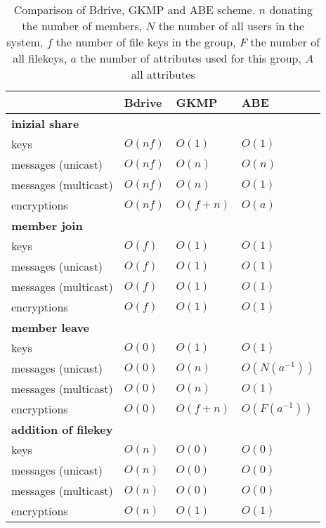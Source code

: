 \begin{table*}[!ht]
\centering
\begin{tabular}{l 		| l 						| l 						| l }
 						& \textbf{Bdrive}			& \textbf{\ac{GKMP}} 			& \textbf{\ac{ABE}} 		\\
\hline
\textbf{inizial share} 																				\\
keys 					& $O(nf)$ 					& $O(1)$	 				& $O(1)$			\\
messages (unicast)		& $O(nf)$  					& $O(n)$					& $O(n)$			\\
messages (multicast) 	& $O(nf)$ 					& $O(n)$ 					& $O(1)$			\\
encryptions				& $O(nf)$ 					& $O(f + n)$				& $O(a)$ 			\\
\hline
\textbf{member join} 																				\\
keys 					& $O(f)$   					& $O(1)$					& $O(1)$			\\
messages (unicast)		& $O(f)$  					& $O(1)$  					& $O(1)$ 			\\
messages (multicast) 	& $O(f)$ 	 				& $O(1)$					& $O(1)$ 			\\
encryptions				& $O(f)$  					& $O(1)$					& $O(1)$ 			\\
\hline
\textbf{member leave}																				\\
keys 					& $O(0)$					& $O(1)$					& $O(1)$			\\
messages (unicast)		& $O(0)$					& $O(n)$  					& $O(N(a^{-1}))$	\\
messages (multicast)	& $O(0)$					& $O(n)$					& $O(1)$ 			\\ 
encryptions 			& $O(0)$					& $O(f + n)$ 				& $O(F(a^{-1}))$	\\
\hline	
\textbf{addition of filekey}																		\\
keys 					& $O(n)$	 				& $O(0)$					& $O(0)$			\\
messages (unicast)		& $O(n)$	 				& $O(0)$					& $O(0)$			\\
messages (multicast)	& $O(n)$ 					& $O(0)$ 					& $O(0)$			\\
encryptions				& $O(n)$ 					& $O(1)$					& $O(1)$			\\
\hline
\end{tabular}
\caption{Comparison of Bdrive, \ac{GKMP} and \ac{ABE} scheme. $n$ donating the number of members, $N$ the number of all users in the system, $f$ the number of file keys in the group, $F$ the number of all filekeys, $a$ the number of attributes used for this group, $A$ all attributes }
\label{tab:comparisonsOWFTtoABE}
\end{table*}

